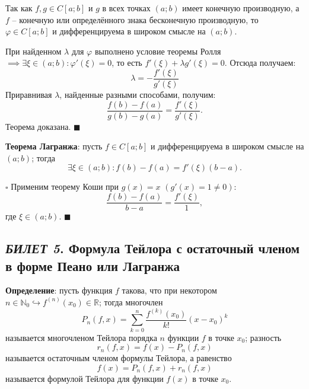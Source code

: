 \documentclass[12pt, a4paper, reqno]{article}
\begin{document}
    Так как $f, g \in C[a; b]$ и $g$ в всех точках $(a; b)$ имеет конечную производную, а $f$ --
    конечную или определённого знака бесконечную производную, то $\varphi \in C[a; b]$ и
    дифференцируема в широком смысле на $(a; b)$.

    При найденном $\lambda$ для $\varphi$ выполнено условие теоремы Ролля $\implies
    \exists\xi\in(a; b): \varphi'(\xi) = 0$, то есть $f'(\xi) + \lambda g'(\xi) = 0$. Отсюда
    получаем:
    \begin{equation*}
        \lambda = -\dfrac{f'(\xi)}{g'(\xi)}
    \end{equation*}
    Приравнивая $\lambda$, найденные разными способами, получим:
    \begin{equation*}
        \dfrac{f(b) - f(a)}{g(b) - g(a)} = \dfrac{f'(\xi)}{g'(\xi)}.
    \end{equation*}
    Теорема доказана. $\blacksquare$

    \textbf{Теорема Лагранжа}: пусть $f \in C[a; b]$ и дифференцируема в широком смысле на $(a; b)$; тогда
    \begin{equation*}
        \exists \xi \in (a; b): f(b) - f(a) = f'(\xi)(b - a).
    \end{equation*}

    $\square$ Применим теорему Коши при $g(x) = x$ $(g'(x) = 1 \neq 0)$:
    \begin{equation*}
        \dfrac{f(b) - f(a)}{b - a} = \dfrac{f'(\xi)}{1},
    \end{equation*}
    где $\xi\in(a; b)$. $\blacksquare$

\newpage
\subsection{\textit{БИЛЕТ 5}. Формула Тейлора с остаточный членом в форме Пеано или Лагранжа}

    \textbf{Определение}: пусть функция $f$ такова, что при некотором $n\in\mathbb{N}_0
    \hookrightarrow f^{(n)}(x_0)\in\mathbb{R}$; тогда многочлен
    \begin{equation*}
        P_n(f, x) = \sum\limits_{k = 0}^{n}\dfrac{f^{(k)}(x_0)}{k!}(x - x_0)^k
    \end{equation*}
    называется многочленом Тейлора порядка $n$ функции $f$ в точке $x_0$; разность
    \begin{equation*}
        r_n(f, x) = f(x) - P_n(f, x)
    \end{equation*}
    называется остаточным членом формулы Тейлора, а равенство
    \begin{equation*}
        f(x) = P_n(f, x) + r_n(f, x)
    \end{equation*}
    называется формулой Тейлора для функции $f(x)$ в точке $x_0$.
\end{document}
